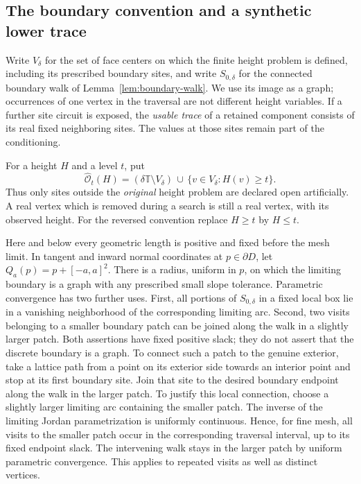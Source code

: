 \documentclass[11pt]{article}
\newcommand{\T}{\mathbb T}
\theoremstyle{definition}
\theoremstyle{remark}
\numberwithin{equation}{section}
\begin{document}
\subsection{The boundary convention and a synthetic lower trace}

Write $V_\delta$ for the set of face centers on which the finite height
problem is defined, including its prescribed boundary sites, and write
$S_{0,\delta}$ for the connected boundary walk of
Lemma~\ref{lem:boundary-walk}.  We use its image as a graph; occurrences
of one vertex in the traversal are not different height variables.
If a further site circuit is exposed, the \emph{usable trace} of a
retained component consists of its real fixed neighboring sites.  The
values at those sites remain part of the conditioning.

For a height $H$ and a level $t$, put
\begin{equation}
 \widehat{\mathcal O}_t(H)
 = (\delta\T\setminus V_\delta)
   \,\cup\,\{v\in V_\delta:H(v)\ge t\}.
 \label{boundary:artificial-exterior}
\end{equation}
Thus only sites outside the \emph{original} height problem are declared
open artificially.  A real vertex which is removed during a search is
still a real vertex, with its observed height.  For the reversed
convention replace $H\ge t$ by $H\le t$.

Here and below every geometric length is positive and fixed before the
mesh limit.  In tangent and inward normal coordinates at
$p\in\partial D$, let $Q_a(p)=p+[-a,a]^2$.  There is a radius, uniform in
$p$, on which the limiting boundary is a graph with any prescribed
small slope tolerance.  Parametric convergence has two further uses.
First, all portions of $S_{0,\delta}$ in a fixed local box lie in a
vanishing neighborhood of the corresponding limiting arc.  Second,
two visits belonging to a smaller boundary patch can be joined along
the walk in a slightly larger patch.  Both assertions have fixed
positive slack; they do not assert that the discrete boundary is a
graph.  To connect such a patch to the genuine exterior, take a lattice
path from a point on its exterior side towards an interior point and
stop at its first boundary site.  Join that site to the desired
boundary endpoint along the walk in the larger patch.  To justify this
local connection, choose a slightly larger limiting arc containing the
smaller patch.  The inverse of the limiting Jordan
parametrization is uniformly continuous.  Hence, for fine mesh, all
visits to the smaller patch occur in the corresponding traversal
interval, up to its fixed endpoint slack.  The intervening walk stays
in the larger patch by uniform parametric convergence.  This applies
to repeated visits as well as distinct vertices.
\end{document}
